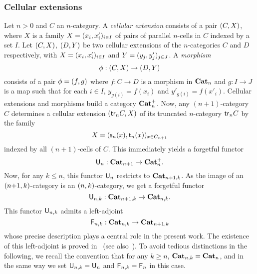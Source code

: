  \subsubsection{Cellular extensions}\label{ssubsec:cellext}
 Let $n>0$ and $C$ an $n$-category. A {\em cellular extension} consists of a pair $(C,X)$, where $X$ is a  family $X=(x_i,x'_i)_{i\in I}$ of pairs of parallel $n$-cells in $C$ indexed by a set $I$. Let $(C,X)$, $(D,Y)$ be two cellular extensions of the $n$-categories $C$ and $D$ respectively, with $X=(x_i,x'_i)_{i\in I}$ and $Y=(y_j,y'_j)_{j\in J}$. A {\em morphism}
 \[\phi:(C,X)\to(D,Y)\]
 consists of a pair $\phi=(f,g)$ where $f:C\to D$ is a morphism in $\mathbf{Cat}_{n}$ and $g:I\to J$ is a map such that for each $i\in I$, $y_{g(i)}=f(x_i)$ and $y'_{g(i)}=f(x'_i)$. Cellular extensions and morphisms build a category $\mathbf{Cat}_{n}^{+}$. Now, any $(n{+}1)$-category $C$ determines a cellular extension $(\mathsf{tr}_{n} C,X)$ of its truncated $n$-category $\mathsf{tr}_{n} C$ by the family
 \[X=(\mathsf{s}_{n}(x),\mathsf{t}_{n}(x))_{x\in C_{n+1}}\]
 indexed by all $(n{+}1)$-cells of $C$. This immediately yields a forgetful functor
 \[\mathsf{U}_{n}:\mathbf{Cat}_{n+1}\to \mathbf{Cat}_{n}^{+}.\]
Now, for any $k\leq n$, this functor $\mathsf{U}_{n}$ restricts to
$\mathbf{Cat}_{n+1,k}$. As the image of an $(n{+}1,k)$-category is an
$(n,k)$-category, we get a forgetful functor
\[\mathsf{U}_{n,k}:\mathbf{Cat}_{n+1,k}\to \mathbf{Cat}_{n,k}.\]
This functor $\mathsf{U}_{n,k}$ admits a left-adjoint
\[\mathsf{F}_{n,k}:\mathbf{Cat}_{n,k}\to \mathbf{Cat}_{n+1,k}\]
whose precise description plays a central role in the present
work. The existence of this left-adjoint is proved
in~\cite{batanin:comfmg} (see also~\cite[Ch.18]{abgmmm:polybk}). To
avoid tedious distinctions in the following, we recall the convention that
for any $k\geq n$, $\mathbf{Cat}_{n,k}=\mathbf{Cat}_{n}$, and in the same way we set
$\mathsf{U}_{n,k}=\mathsf{U}_{n}$ and $\mathsf{F}_{n,k}=\mathsf{F}_{n}$ in this case.

